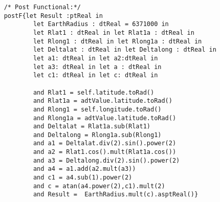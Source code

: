 	\scriptsize
	\vspace{0.5cm}
	\begin{lstlisting}[style=MessirStyle,firstnumber=auto,captionpos=b,caption={\msrmessir (MCL-oriented) specification of the operation \emph{DistanceTo}.},label=OM-dtGPSLocation-DistanceTo-MCL-LST]

	
	
	/* Post Functional:*/ 
	postF{let Result :ptReal in
	      	let EarthRadius : dtReal = 6371000 in 
	      	let Rlat1 : dtReal in let Rlat1a : dtReal in
	      	let Rlong1 : dtReal in let Rlong1a : dtReal in
	      	let Deltalat : dtReal in let Deltalong : dtReal in
	      	let a1: dtReal in let a2:dtReal in 
	      	let a3: dtReal in let a : dtReal in
	      	let c1: dtReal in let c: dtReal in
	      	
	      	and Rlat1 = self.latitude.toRad()
	      	and Rlat1a = adtValue.latitude.toRad()
	      	and Rlong1 = self.longitude.toRad()
	      	and Rlong1a = adtValue.latitude.toRad()
	      	and Deltalat = Rlat1a.sub(Rlat1)
	      	and Deltalong = Rlong1a.sub(Rlong1)
	      	and a1 = Deltalat.div(2).sin().power(2)
	      	and a2 = Rlat1.cos().mult(Rlat1a.cos())
	      	and a3 = Deltalong.div(2).sin().power(2)
	      	and a4 = a1.add(a2.mult(a3))
	      	and c1 = a4.sub(1).power(2)
	      	and c = atan(a4.power(2),c1).mult(2)
	      	and Result =  EarthRadius.mult(c).asptReal()}
	
	
	\end{lstlisting}
	\normalsize 
	
	
	
	






